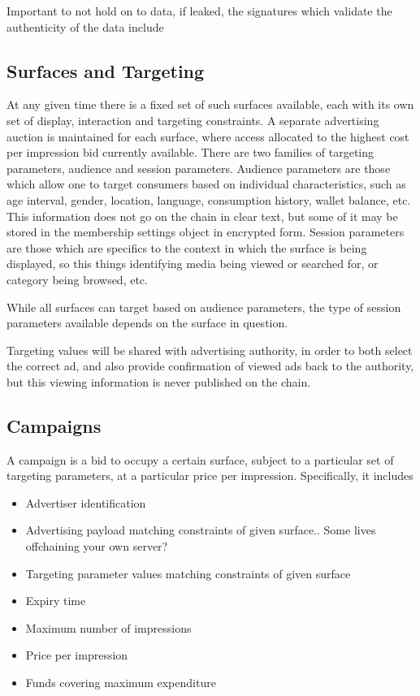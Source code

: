 \documentclass{article}
\begin{document}
Important to not hold on to data, if leaked, the signatures which validate the authenticity of the data include

\subsection{Surfaces and Targeting}

At any given time there is a fixed set of such surfaces available, each with its own set of display, interaction and targeting constraints. A separate advertising auction is maintained for each surface, where access allocated to the highest cost per impression bid currently available.
There are two families of targeting parameters, audience and session parameters. Audience parameters are those which allow one to target consumers based on individual characteristics, such as age interval, gender, location, language, consumption history, wallet balance, etc. This information does not go on the chain in clear text, but some of it may be stored in the membership settings object in encrypted form. Session parameters are those which are specifics to the context in which the surface is being displayed, so this things identifying media being viewed or searched for, or category being browsed, etc.

While all surfaces can target based on audience parameters, the type of session parameters available depends on the surface in question.

Targeting values will be shared with advertising authority, in order to both select the correct ad, and also provide confirmation of viewed ads back to the authority, but this viewing information is never published on the chain.

\subsection{Campaigns}

A campaign is a bid to occupy a certain surface, subject to a particular set of targeting parameters, at a particular price per impression. Specifically, it includes

\begin{itemize}
 \item Advertiser identification
 \item Advertising payload matching constraints of given surface.. Some lives offchaining your own server?
 \item Targeting parameter values matching constraints of given surface
 \item Expiry time
 \item Maximum number of impressions
 \item Price per impression
 \item Funds covering maximum expenditure
\end{itemize}
\end{document}
